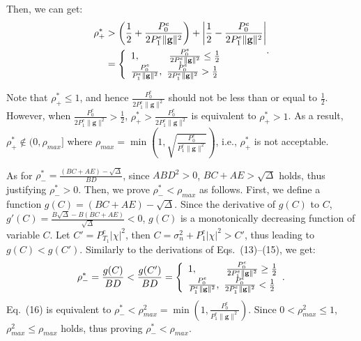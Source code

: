 \documentclass[10pt, conference, letterpaper]{IEEEtran}
\begin{document}
Then, we can get:
\begin{equation}
\begin{aligned}
\rho^{*}_{+}&>\left(\frac{1}{2}+\frac{P^{e}_{0}}{2P^{e}_{1}\|\mathbf{g}\|^{2}}\right)+
\left|\frac{1}{2}-\frac{P^{e}_{0}}{2P^{e}_{1}\|\mathbf{g}\|^{2}}\right|\\
&=\left\{
\begin{array}{l}
1,\scriptsize{~~~~~~~~~~~}\frac{P^{e}_{0}}{2P^{e}_{1}\|\mathbf{g}\|^{2}}\leq\frac{1}{2}\\
\frac{P^{e}_{0}}{P^{e}_{1}\|\mathbf{g}\|^{2}},~\frac{P^{e}_{0}}{2P^{e}_{1}
\|\mathbf{g}\|^{2}}>\frac{1}{2}
\end{array}
\right.
\end{aligned}.
\vspace*{-0.05in}
\end{equation}

Note that $\rho^{*}_{+}\leq 1$, and hence
$\frac{P^{e}_{0}}{2P^{e}_{1}\|\mathbf{g}\|^{2}}$
should not be less than or equal to $\frac{1}{2}$.
However, when $\frac{P^{e}_{0}}{2P^{e}_{1}\|\mathbf{g}\|^{2}}>\frac{1}{2}$,
$\rho^{*}_{+}>\frac{P^{e}_{0}}{2P^{e}_{1}\|\mathbf{g}\|^{2}}$ is equivalent to $\rho^{*}_{+}>1$.
As a result, $\rho^{*}_{+}\notin (0,\rho_{max}]$ where
$\rho_{max}=\min\left(1,\sqrt{\frac{P^{e}_{0}}{P^{e}_{1}\|\mathbf{g}\|^2}}\right)$,
i.e., $\rho^{*}_{+}$ is not acceptable.

As for $\rho^{*}_{-}=\frac{(BC+AE)-\sqrt{\Delta}}{BD}$,
since $ABD^2>0$, $BC+AE>\sqrt{\Delta}$ holds, thus justifying $\rho^{*}_{-}>0$.
Then, we prove $\rho^{*}_{-}<\rho_{max}$ as follows.
First, we define a function $g(C)=(BC+AE)-\sqrt{\Delta}$.
Since the derivative of $g(C)$ to $C$,
$g'(C)=\frac{B\sqrt{\Delta}-B(BC+AE)}{\sqrt{\Delta}}<0$,
$g(C)$ is a monotonically decreasing function of variable $C$.
Let $C'=P^{e}_{T_{1}}|\chi|^{2}$,
then $C=\sigma^{2}_{n}+P^{e}_{1}|\chi|^{2}>C'$,
thus leading to $g(C)<g(C')$.
Similarly to the derivations of Eqs.~(13)--(15), we get:
\begin{equation}
\begin{aligned}
\rho^{*}_{-}=\frac{g(C)}{BD}
<\frac{g(C')}{BD}=\left\{
\begin{array}{l}
1,\scriptsize{~~~~~~~~~~~}\frac{P^{e}_{0}}{2P^{e}_{1}\|\mathbf{g}\|^{2}}\geq\frac{1}{2}\\
\frac{P^{e}_{0}}{P^{e}_{1}\|\mathbf{g}\|^{2}},~\frac{P^{e}_{0}}{2P^{e}_{1}
\|\mathbf{g}\|^{2}}<\frac{1}{2}
\end{array}.
\right.
\end{aligned}
\end{equation}
Eq.~(16) is equivalent to $\rho^{*}_{-}<\rho^{2}_{max}=\min\left(1,\frac{P^{e}_{0}}{P^{e}_{1}\|\mathbf{g}\|^{2}}\right)$.
Since $0<\rho^{2}_{max}\leq 1$, $\rho^{2}_{max}\leq \rho_{max}$ holds, thus proving $\rho^{*}_{-}<\rho_{max}$.
\end{document}
